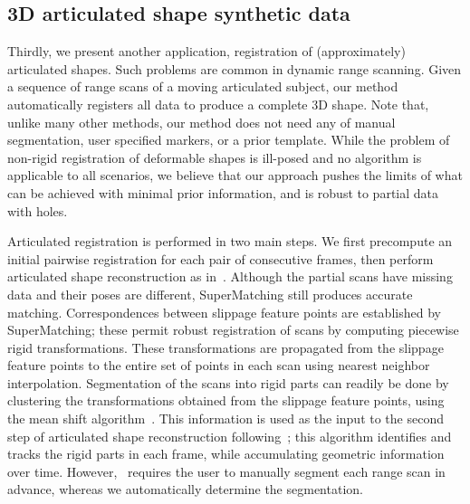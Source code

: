 

\subsection{3D articulated shape synthetic data}
\label{subsec:3darticulated}

Thirdly, we present another application, registration of (approximately) articulated shapes. Such problems are common in dynamic range scanning.
Given a sequence of range scans of a moving articulated subject, our method automatically registers all data to produce a complete 3D shape.
Note that, unlike many other methods, our method does not need any of manual segmentation, user specified markers, or a prior template.
While the problem of non-rigid registration of deformable shapes is ill-posed and no algorithm is applicable to all scenarios, 
we believe that our approach pushes the limits of what can be achieved with minimal prior information, and is robust to partial data with holes.

Articulated registration is performed in two main steps.
We first precompute an initial pairwise registration for each pair of consecutive frames, then perform articulated shape reconstruction as in~\cite{Pekelny08}.
Although the partial scans have missing data and their poses are different,  SuperMatching still produces accurate matching.
Correspondences between slippage feature points are established by  SuperMatching; these permit robust registration of scans  by computing piecewise rigid transformations.
These transformations are propagated from the slippage feature points to the entire set of points in each scan using nearest neighbor interpolation.
Segmentation of  the scans into rigid parts can readily be done by clustering the transformations obtained from the slippage feature points, using the mean shift algorithm~\cite{Comaniciu02}.
This information is used as the input to the second step of articulated shape reconstruction following~\cite{Pekelny08};
this algorithm identifies and tracks the rigid parts in each frame, while accumulating  geometric information over time.
However,~\cite{Pekelny08} requires the user to manually segment each range scan in advance,  whereas we automatically determine  the segmentation.

